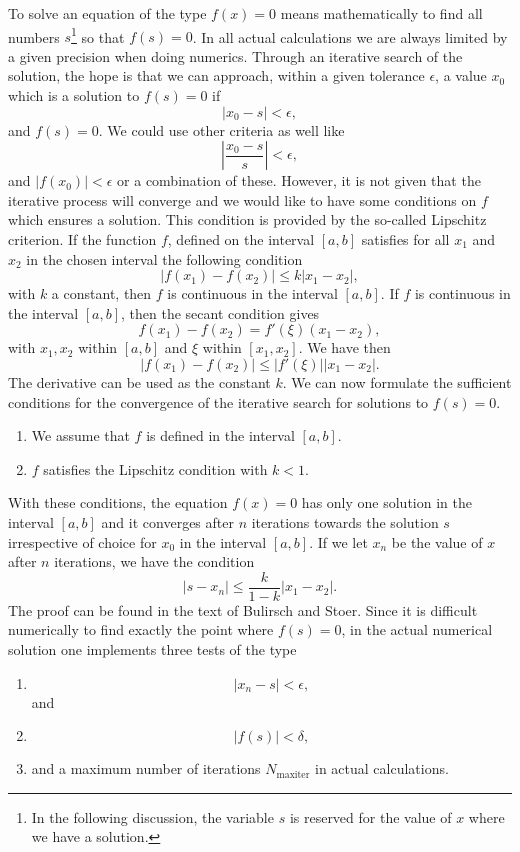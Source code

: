 To solve an equation of the type $f(x)=0$ means mathematically to find
all numbers $s$\footnote{In the following discussion, the variable $s$ 
is reserved for the value of $x$ where we have a solution.}
so that $f(s)=0$. In all actual calculations we are always limited
by a given precision when doing numerics. 
Through an iterative search of the solution, the hope is that we can approach,
within a given 
tolerance $\epsilon$, a value $x_0$ which is a solution to $f(s)=0$ if
\[
    |x_0-s| < \epsilon,
\]
and $f(s)=0$. We 
could use other criteria as well like
\[
     \left|\frac{x_0-s}{s}\right| < \epsilon,
\]
and $|f(x_0)| < \epsilon$ or a combination of these.
However, it is not given that the iterative process will converge and we would like
to have some conditions on $f$ which  ensures a solution. 
This condition is provided by the so-called Lipschitz criterion. If the function $f$,
defined on the interval $[a,b]$ satisfies for all $x_1$ and $x_2$ in the chosen
interval the following condition
\[
   \left| f(x_1)-f(x_2)\right| \le k\left|x_1-x_2\right|,
\]
with $k$ a constant, then $f$ is continuous in the interval $[a,b]$. If $f$ 
is continuous in the interval $[a,b]$, then the secant condition gives
\[
      f(x_1)-f(x_2) = f'(\xi)(x_1-x_2),
\]
with $x_1,x_2$ within $[a,b]$ and $\xi$ within $[x_1,x_2]$. We have then
\[
   \left| f(x_1)-f(x_2)\right| \le |f'(\xi)|\left|x_1-x_2\right|.
\]
The derivative can be used as the constant $k$. We can now formulate 
the sufficient conditions for the convergence of the iterative search
for solutions to $f(s)=0$. 
\begin{enumerate}
   \item We assume that $f$ is defined in the interval $[a,b]$.
   \item $f$ satisfies the  Lipschitz condition with $k < 1$.
\end{enumerate}  
With these conditions, the equation $f(x)=0$ has only one solution
in the interval $[a,b]$ and it converges after $n$ iterations 
towards the solution $s$ irrespective of choice for $x_0$ in the interval
$[a,b]$. If we let $x_n$ be the value of $x$ after $n$ iterations,
we have the condition
\begin{equation}
   \left|s-x_n\right| \le \frac{k}{1-k}\left|x_1-x_2\right|.
   \label{eq:itercond}
\end{equation}       
The proof can be found in the text of Bulirsch and Stoer.
Since it is difficult
numerically to find exactly the point where $f(s)=0$, in the actual
numerical solution
one implements three tests of the type
\begin{enumerate}
\item
\[
    |x_n-s| < \epsilon,
\]
and 
\item
\[
    |f(s)| < \delta,
\]
\item 
and a maximum number of iterations $N_{\mathrm{maxiter}}$
in actual calculations.
\end{enumerate}
